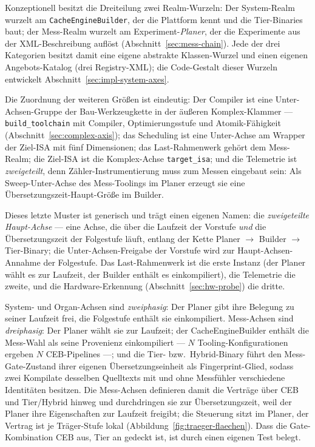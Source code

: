\begin{nurlang}
Konzeptionell besitzt die Dreiteilung zwei Realm-Wurzeln: Der System-Realm wurzelt am
\texttt{CacheEngineBuilder}, der die Plattform kennt und die Tier-Binaries baut; der Mess-Realm
wurzelt am Experiment-\emph{Planer}, der die Experimente aus der XML-Beschreibung auflöst
(Abschnitt~\ref{sec:mess-chain}). Jede der drei Kategorien besitzt damit eine eigene abstrakte
Klassen-Wurzel und einen eigenen Angebots-Katalog (drei Registry-XML); die Code-Gestalt dieser Wurzeln
entwickelt Abschnitt~\ref{sec:impl-system-axes}.

Die Zuordnung der weiteren Größen ist eindeutig: Der Compiler ist eine Unter-Achsen-Gruppe der
Bau-Werkzeugkette in der äußeren Komplex-Klammer --- \texttt{build\_toolchain} mit Compiler,
Optimierungsstufe und Atomik-Fähigkeit (Abschnitt~\ref{sec:complex-axis}); das Scheduling ist eine
Unter-Achse am Wrapper der Ziel-ISA mit fünf Dimensionen; das Last-Rahmenwerk gehört dem Mess-Realm;
die Ziel-ISA ist die Komplex-Achse \texttt{target\_isa}; und die Telemetrie ist \emph{zweigeteilt}, denn
Zähler-Instrumentierung muss zum Messen eingebaut sein: Als Sweep-Unter-Achse des Mess-Toolings im
Planer erzeugt sie eine Übersetzungszeit-Haupt-Größe im Builder.

Dieses letzte Muster ist generisch und trägt einen eigenen Namen: die \emph{zweigeteilte
Haupt-Achse} --- eine Achse, die über die Laufzeit der Vorstufe \emph{und} die Übersetzungszeit der
Folgestufe läuft, entlang der Kette Planer $\to$ Builder $\to$ Tier-Binary; die
Unter-Achsen-Freigabe der Vorstufe wird zur Haupt-Achsen-Annahme der Folgestufe. Das Last-Rahmenwerk
ist die erste Instanz (der Planer wählt es zur Laufzeit, der Builder enthält es einkompiliert), die
Telemetrie die zweite, und die Hardware-Erkennung (Abschnitt~\ref{sec:hw-probe}) die dritte.

System- und Organ-Achsen sind \emph{zweiphasig}: Der Planer gibt ihre Belegung zu seiner Laufzeit frei,
die Folgestufe enthält sie einkompiliert. Mess-Achsen sind \emph{dreiphasig}: Der Planer wählt sie zur
Laufzeit; der CacheEngineBuilder enthält die Mess-Wahl als seine Provenienz einkompiliert --- $N$
Tooling-Konfigurationen ergeben $N$ CEB-Pipelines ---; und die Tier- bzw.\ Hybrid-Binary führt den
Mess-Gate-Zustand ihrer eigenen Übersetzungseinheit als Fingerprint-Glied, sodass zwei Kompilate
desselben Quelltexts mit und ohne Messfühler verschiedene Identitäten besitzen. Die Mess-Achsen
definieren damit die Verträge über CEB und Tier/Hybrid hinweg und durchdringen sie zur
Übersetzungszeit, weil der Planer ihre Eigenschaften zur Laufzeit freigibt; die Steuerung sitzt im
Planer, der Vertrag ist je Träger-Stufe lokal (Abbildung~\ref{fig:traeger-flaechen}). Dass die
Gate-Kombination CEB aus, Tier an gedeckt ist, ist durch einen eigenen Test belegt.
\end{nurlang}
